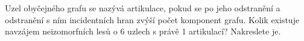 Uzel obyčejného grafu se nazývá artikulace, pokud se po jeho odstranění a
odstranění s ním incidentních hran zvýší počet komponent grafu. Kolik existuje
navzájem neizomorfních lesů o 6 uzlech s právě 1 artikulací? Nakreslete je.

